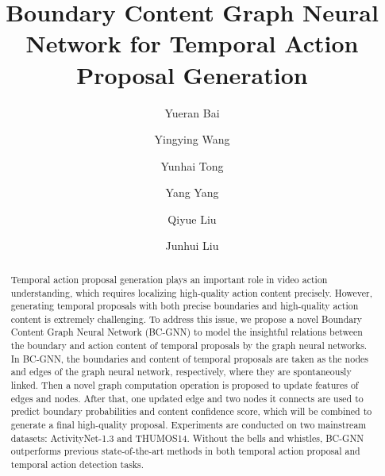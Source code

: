 \documentclass[runningheads]{llncs}
\begin{document}
\pagestyle{headings}
\mainmatter
\def\ECCVSubNumber{6021}  

\title{Boundary Content Graph Neural Network for Temporal Action Proposal Generation} 

\begin{comment}
\titlerunning{ECCV-20 submission ID \ECCVSubNumber}
\authorrunning{ECCV-20 submission ID \ECCVSubNumber}
\author{Anonymous ECCV submission}
\institute{Paper ID \ECCVSubNumber}
\end{comment}


\author{Yueran Bai \and Yingying Wang \and Yunhai Tong \and Yang Yang  \and Qiyue Liu  \and Junhui Liu  }


\maketitle

\begin{abstract}
Temporal action proposal generation plays an important role in video action understanding, which requires localizing high-quality action content precisely. However, generating temporal proposals with both precise boundaries and high-quality action content is extremely challenging. To address this issue, we propose a novel Boundary Content Graph Neural Network (BC-GNN) to model the insightful relations between the boundary and action content of temporal proposals by the graph neural networks. In BC-GNN, the boundaries and content of temporal proposals are taken as the nodes and edges of the graph neural network, respectively, where they are spontaneously linked. Then a novel graph computation operation is proposed to update features of edges and nodes. After that, one updated edge and two nodes it connects are used to predict boundary probabilities and content confidence score, which will be combined to generate a final high-quality proposal. Experiments are conducted on two mainstream datasets: ActivityNet-1.3 and THUMOS14. Without the bells and whistles, BC-GNN outperforms previous state-of-the-art
methods in both temporal action proposal and temporal action detection tasks.
\end{abstract}
\renewcommand{\thefootnote}{}
\end{document}
